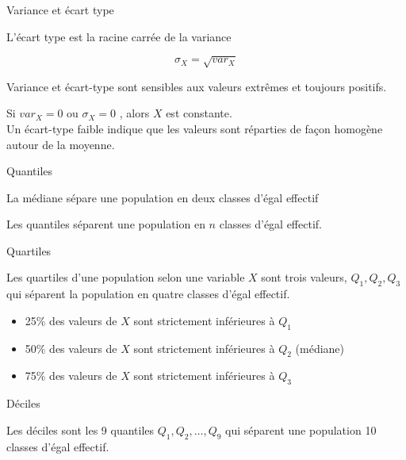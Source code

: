 \documentclass{beamer}
\begin{document}
\begin{frame}{Variance et écart type}


L'\alert{écart type} est la racine carrée de la variance


$$\sigma_X = \sqrt{var_X}$$ 



Variance et écart-type sont sensibles aux valeurs extrêmes et toujours positifs.\\





\begin{tiny}
\begin{spacing}{0.8}
Si $var_X = 0$ ou $\sigma_X = 0$ , alors $X$ est \alert{constante}.\\
Un écart-type faible indique que les valeurs sont réparties de façon \alert{homogène} autour de la moyenne.
\end{spacing}
\end{tiny}



\end{frame}


\begin{frame}{Quantiles}
 

La \alert{médiane} sépare une population en \alert{deux} classes d'égal effectif 

Les \alert{quantiles}  séparent une population en \alert{$n$} classes d'égal effectif.
\end{frame}


\begin{frame}{Quartiles}




Les \alert{quartiles} d'une population selon une variable $X$ sont trois valeurs, $Q_1,Q_2,Q_3$ qui séparent la population en \alert{quatre} classes d'égal effectif.

\begin{itemize}
  \item 25\% des valeurs de $X$ sont strictement inférieures à $Q_1$
  \item 50\% des valeurs de $X$ sont strictement inférieures à $Q_2$ (médiane)
  \item 75\% des valeurs de $X$ sont strictement inférieures à $Q_3$
\end{itemize}
\end{frame}


\begin{frame}{Déciles}



Les déciles sont les \alert{9} quantiles $Q_1,Q_2,\dots,Q_9$ qui séparent une population  \alert{10} classes d'égal effectif.

\end{frame}
\end{document}
